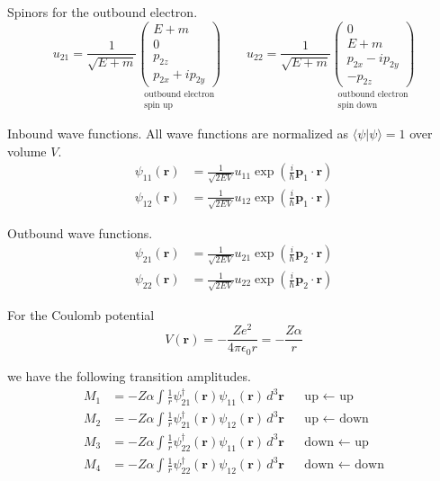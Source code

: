 Spinors for the outbound electron.
\begin{equation*}
u_{21}=\frac{1}{\sqrt{E+m}}
\underset{\substack{\text{outbound electron}\\ \text{spin up}}}
{\begin{pmatrix}E+m\\0\\p_{2z}\\p_{2x}+ip_{2y}\end{pmatrix}}
\qquad
u_{22}=\frac{1}{\sqrt{E+m}}
\underset{\substack{\text{outbound electron}\\ \text{spin down}}}
{\begin{pmatrix}0\\E+m\\p_{2x}-ip_{2y}\\-p_{2z}\end{pmatrix}}
\end{equation*}

Inbound wave functions.
All wave functions are normalized as $\langle\psi|\psi\rangle=1$ over volume $V$.
\begin{align*}
\psi_{11}(\mathbf r)&=\frac{1}{\sqrt{2EV}}u_{11}\exp\left(\frac{i}{\hbar}\mathbf p_1\cdot\mathbf r\right)
\\[1ex]
\psi_{12}(\mathbf r)&=\frac{1}{\sqrt{2EV}}u_{12}\exp\left(\frac{i}{\hbar}\mathbf p_1\cdot\mathbf r\right)
\end{align*}

Outbound wave functions.
\begin{align*}
\psi_{21}(\mathbf r)&=\frac{1}{\sqrt{2EV}}u_{21}\exp\left(\frac{i}{\hbar}\mathbf p_2\cdot\mathbf r\right)
\\[1ex]
\psi_{22}(\mathbf r)&=\frac{1}{\sqrt{2EV}}u_{22}\exp\left(\frac{i}{\hbar}\mathbf p_2\cdot\mathbf r\right)
\end{align*}

For the Coulomb potential
\begin{equation*}
V(\mathbf r)=-\frac{Ze^2}{4\pi\epsilon_0r}=-\frac{Z\alpha}{r}
\end{equation*}

we have the following transition amplitudes.
\begin{align*}
M_1&=-Z\alpha
\int\frac{1}{r}\psi_{21}^\dag(\mathbf r)\psi_{11}(\mathbf r)\,d^3\mathbf r
& &\text{up $\leftarrow$ up}
\\[1ex]
M_2&=-Z\alpha
\int\frac{1}{r}\psi_{21}^\dag(\mathbf r)\psi_{12}(\mathbf r)\,d^3\mathbf r
& &\text{up $\leftarrow$ down}
\\[1ex]
M_3&=-Z\alpha
\int\frac{1}{r}\psi_{22}^\dag(\mathbf r)\psi_{11}(\mathbf r)\,d^3\mathbf r
& &\text{down $\leftarrow$ up}
\\[1ex]
M_4&=-Z\alpha
\int\frac{1}{r}\psi_{22}^\dag(\mathbf r)\psi_{12}(\mathbf r)\,d^3\mathbf r
& &\text{down $\leftarrow$ down}
\end{align*}

